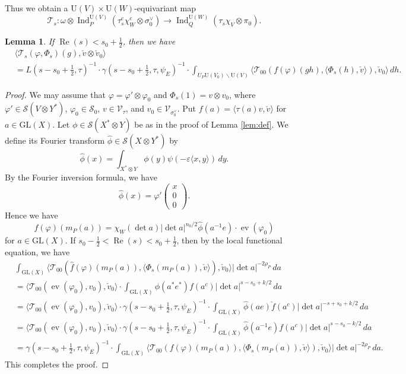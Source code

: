 \documentclass[11pt]{amsart}
\numberwithin{equation}{section}
\theoremstyle{plain}
\newtheorem{lem}[thm]{Lemma}
\theoremstyle{definition}
\theoremstyle{remark}
\def\ev{\operatorname{ev}}
\def\Ind{\operatorname{Ind}}
\def\Re{\operatorname{Re}}
\def\GL{\mathrm{GL}}
\def\U{\mathrm{U}}
\def\T{\mathcal{T}}
\def\s{\mathscr{S}}
\def\V{\mathscr{V}}
\begin{document}
Thus we obtain a $\U(V) \times \U(W)$-equivariant map
\[
 \T_s:\omega \otimes \Ind^{\U(V)}_P(\tau^c_s \chi_W^c \otimes \sigma_0^\vee) \longrightarrow
 \Ind^{\U(W)}_Q(\tau_s \chi_V \otimes \pi_0).
\]

\begin{lem}
\label{lem:def2}
If $\Re (s) < s_0 + \frac{1}{2}$, then we have
\begin{align*}
 & \langle \T_s(\varphi, \Phi_s)(g), \check{v} \otimes \check{v}_0 \rangle \\
 & = L(s-s_0+\tfrac{1}{2}, \tau)^{-1} \cdot \gamma(s-s_0+\tfrac{1}{2}, \tau, \psi_E)^{-1} \cdot \int_{U_P \U(V_0) \backslash \U(V)}
 \langle \T_{00}(f(\varphi)(gh), \langle \Phi_s(h), \check{v} \rangle ), \check{v}_0 \rangle \, dh.
\end{align*}
\end{lem}

\begin{proof}
We may assume that $\varphi = \varphi' \otimes \varphi_0$ and $\Phi_s(1) = v \otimes v_0$, where $\varphi' \in \s(V \otimes Y^*)$, $\varphi_0 \in \s_0$, $v \in \V_{\tau}$, and $v_0 \in \V_{\sigma_0^\vee}$.
Put $f(a) = \langle \tau(a) v, \check{v} \rangle$ for $a \in \GL(X)$.
Let $\phi \in \s(X^* \otimes Y)$ be as in the proof of Lemma \ref{lem:def}.
We define its Fourier transform $\hat{\phi} \in \s(X \otimes Y^*)$ by
\[
 \hat{\phi}(x)
 = \int_{X^* \otimes Y} \phi(y) \psi(-\varepsilon\langle x, y \rangle ) \, dy.
\]
By the Fourier inversion formula, we have
\[
 \hat{\phi}(x) = \varphi'
 \begin{pmatrix}
  x \\
  0 \\
  0
 \end{pmatrix}.
\]
Hence we have
\[
  f(\varphi)(m_P(a))
 = \chi_W(\det a) |\det a|^{n_0/2} \hat{\phi}(a^{-1} e) \cdot \ev(\varphi_0)
\]
for $a \in \GL(X)$.
If $s_0-\frac{1}{2} < \Re (s) < s_0+\frac{1}{2}$, then by the local functional equation, we have
\begin{align*}
 & \int_{\GL(X)} \langle \T_{00}(\hat{f}(\varphi)(m_P(a)), \langle \Phi_s(m_P(a)), \check{v} \rangle ), \check{v}_0 \rangle
 |\det a|^{-2 \rho_P} \, da \\
 & = \langle \T_{00}(\ev(\varphi_0), v_0), \check{v}_0 \rangle
 \cdot \int_{\GL(X)} \phi(a^* e^*) f(a^c) |\det a|^{s-s_0+k/2} \, da \\
 & = \langle \T_{00}(\ev(\varphi_0), v_0), \check{v}_0 \rangle
 \cdot \gamma(s-s_0+\tfrac{1}{2}, \tau, \psi_E)^{-1} \cdot 
 \int_{\GL(X)} \hat{\phi}(ae) \check{f}(a^c) |\det a|^{-s+s_0+k/2} \, da \\
 & = \langle \T_{00}(\ev(\varphi_0), v_0), \check{v}_0 \rangle
 \cdot \gamma(s-s_0+\tfrac{1}{2}, \tau, \psi_E)^{-1} \cdot
 \int_{\GL(X)} \hat{\phi}(a^{-1} e) f(a^c) |\det a|^{s-s_0-k/2} \, da \\
 & = \gamma(s-s_0+\tfrac{1}{2}, \tau, \psi_E)^{-1} \cdot
 \int_{\GL(X)} \langle \T_{00}(f(\varphi)(m_P(a)), \langle \Phi_s(m_P(a)), \check{v} \rangle ), \check{v}_0 \rangle
 |\det a|^{-2\rho_P} \, da.
\end{align*}
This completes the proof.
\end{proof}
\end{document}
